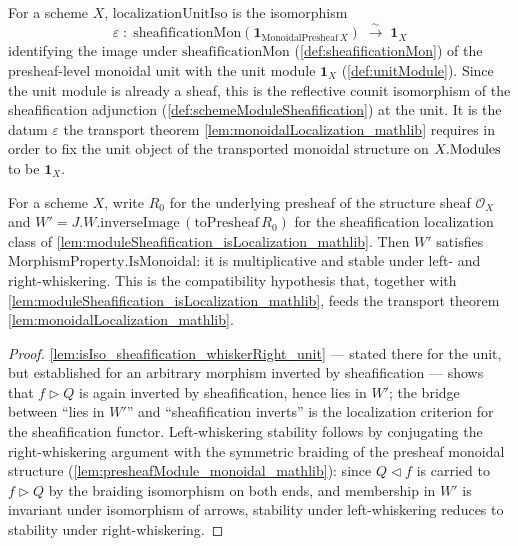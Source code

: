 \begin{definition}\leanok
  \label{def:localizationUnitIso}
  For a scheme \(X\), \(\mathrm{localizationUnitIso}\) is the isomorphism
  \[
    \varepsilon \;:\;
      \mathrm{sheafificationMon}(\mathbf{1}_{\mathrm{MonoidalPresheaf}\,X})
      \;\xrightarrow{\ \sim\ }\; \mathbf{1}_X
  \]
  identifying the image under \(\mathrm{sheafificationMon}\)
  (\cref{def:sheafificationMon}) of the presheaf-level monoidal unit with the
  unit module \(\mathbf{1}_X\) (\cref{def:unitModule}). Since the unit module is
  already a sheaf, this is the reflective counit isomorphism of the
  sheafification adjunction (\cref{def:schemeModuleSheafification}) at the unit.
  It is the datum \(\varepsilon\) the transport theorem
  \cref{lem:monoidalLocalization_mathlib} requires in order to fix the unit
  object of the transported monoidal structure on \(X.\mathrm{Modules}\) to be
  \(\mathbf{1}_X\).
\end{definition}

\begin{definition}\leanok
  \label{def:sheafModule_W_isMonoidal}
  For a scheme \(X\), write \(R_0\) for the underlying presheaf of the structure
  sheaf \(\mathcal{O}_X\) and
  \(W' = J.W.\mathrm{inverseImage}\,(\mathrm{toPresheaf}\,R_0)\) for the
  sheafification localization class of
  \cref{lem:moduleSheafification_isLocalization_mathlib}. Then \(W'\) satisfies
  \(\mathrm{MorphismProperty.IsMonoidal}\): it is multiplicative and stable under
  left- and right-whiskering. This is the compatibility hypothesis that, together
  with \cref{lem:moduleSheafification_isLocalization_mathlib}, feeds the transport
  theorem \cref{lem:monoidalLocalization_mathlib}.
\end{definition}

\begin{proof}
  \leanok
  \cref{lem:isIso_sheafification_whiskerRight_unit} --- stated there for the unit,
  but established for an arbitrary morphism inverted by sheafification --- shows
  that \(f \rhd Q\) is again inverted by sheafification, hence lies in \(W'\); the
  bridge between ``lies in \(W'\)'' and ``sheafification inverts'' is the
  localization criterion for the sheafification functor. Left-whiskering stability
  follows by conjugating the right-whiskering argument with the symmetric braiding of
  the presheaf monoidal structure (\cref{lem:presheafModule_monoidal_mathlib}):
  since \(Q \lhd f\) is carried to \(f \rhd Q\) by the braiding isomorphism on
  both ends, and membership in \(W'\) is invariant under isomorphism of arrows,
  stability under left-whiskering reduces to stability under right-whiskering.
\end{proof}

